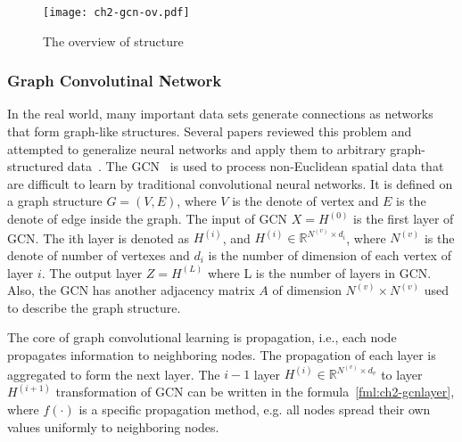 \begin{figure}[htbp!]
	\centering
	\texttt{[image: ch2-gcn-ov.pdf]}
	\caption{The overview of structure}\label{fig:ch2-gcn-ov}
\end{figure}



\subsubsection{Graph Convolutinal Network}

In the real world, many important data sets generate connections as networks that form graph-like structures. Several papers reviewed this problem and attempted to generalize neural networks and apply them to arbitrary graph-structured data~\cite{wu2018socialgcn, dettmers2018convolutional}. The GCN~\cite{kipf2016semi} is used to process non-Euclidean spatial data that are difficult to learn by traditional convolutional neural networks. It is defined on a graph structure \(G=(V, E)\), where \(V\) is the denote of vertex and \(E\) is the denote of edge inside the graph. The input of GCN \(X = H^{(0)}\) is the first layer of GCN. The ith layer is denoted as \(H^{(i)}\), and \(H^{(i)}\in \mathbb{R}^{N^{(v)}\times d_{i}}\), where \(N^{(v)}\) is the denote of number of vertexes and \(d_{i}\) is the number of dimension of each vertex of layer \(i\). The output layer \(Z = H^{(L)}\) where L is the number of layers in GCN\@. Also, the GCN has another adjacency matrix \(A\) of dimension \(N^{(v)}\times N^{(v)}\) used to describe the graph structure.

The core of graph convolutional learning is propagation, i.e., each node propagates information to neighboring nodes. The propagation of each layer is aggregated to form the next layer. The \(i-1\) layer \(H^{(i)}\in \mathbb{R}^{N^{(v)}\times d_v}\) to layer \(H^{(i+1)}\) transformation of GCN can be written in the formula~\ref{fml:ch2-gcnlayer}, where \(f(\cdot)\) is a specific propagation method, e.g. all nodes spread their own values uniformly to neighboring nodes.

